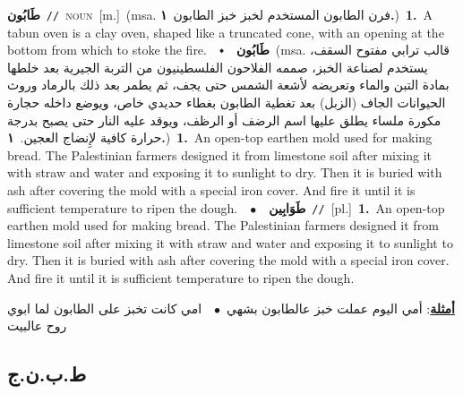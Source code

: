 \documentclass[10pt,a4paper,twoside]{article} %
\begin{document}
\begin{multicols}{2}
{\setlength\topsep{0pt}\textbf{\foreignlanguage{arabic}{طَابُون}}\ {\color{gray}\texttt{//}\color{black}}\ \textsc{noun}\ [m.]\ \color{gray}(msa. \foreignlanguage{arabic}{فرن الطابون المستخدم لخبز خبز الطابون}~\foreignlanguage{arabic}{\textbf{١.}})\color{black}\ \textbf{1.}~A tabun oven is a clay oven, shaped like a truncated cone, with an opening at the bottom from which to stoke the fire.\ \ $\smblkdiamond$\ \ \setlength\topsep{0pt}\textbf{\foreignlanguage{arabic}{طَابُون}}\ \color{gray}(msa. \foreignlanguage{arabic}{قالب ترابي مفتوح السقف، يستخدم لصناعة الخبز، صممه الفلاحون الفلسطينيون من التربة الجيرية بعد خلطها بمادة التبن والماء وتعريضه لأشعة الشمس حتى يجف، ثم يطمر بعد ذلك بالرماد وروث الحيوانات الجاف (الزبل) بعد تغطية الطابون بغطاء حديدي خاص، ويوضع داخله حجارة مكورة ملساء يطلق عليها اسم الرضف أو الرظف، ويوقد عليه النار حتى يصبح بدرجة حرارة كافية لإِنضاج العجين.}~\foreignlanguage{arabic}{\textbf{١.}})\color{black}\ \textbf{1.}~An open-top earthen mold used for making bread. The Palestinian farmers designed it from limestone soil after mixing it with straw and water and exposing it to sunlight to dry. Then it is buried with ash after covering the mold with a special iron cover. And fire it until it is sufficient temperature to ripen the dough.\ \ $\bullet$\ \ \setlength\topsep{0pt}\textbf{\foreignlanguage{arabic}{طَوَابِين}}\ {\color{gray}\texttt{//}\color{black}}\ [pl.]\ \textbf{1.}~An open-top earthen mold used for making bread. The Palestinian farmers designed it from limestone soil after mixing it with straw and water and exposing it to sunlight to dry. Then it is buried with ash after covering the mold with a special iron cover. And fire it until it is sufficient temperature to ripen the dough.\  \begin{flushright}\color{gray}\foreignlanguage{arabic}{\textbf{\underline{\foreignlanguage{arabic}{أمثلة}}}: أمي اليوم عملت خبز عالطابون بشهي\ $\bullet$\ \  امي كانت تخبز على الطابون لما ابوي روح عالبيت}\end{flushright}\color{black}} \vspace{2mm}

\vspace{-3mm}
\subsection*{\color{blue}\foreignlanguage{arabic}{ط.ب.ن.ج}\color{blue}{ (ntws)}} 


\end{multicols}
\end{document}
